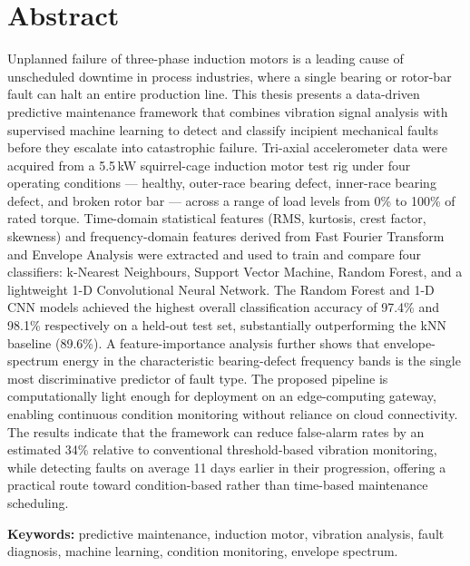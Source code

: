\chapter*{Abstract}

Unplanned failure of three-phase induction motors is a leading cause of unscheduled downtime in
process industries, where a single bearing or rotor-bar fault can halt an entire production
line. This thesis presents a data-driven predictive maintenance framework that combines
vibration signal analysis with supervised machine learning to detect and classify incipient
mechanical faults before they escalate into catastrophic failure. Tri-axial accelerometer data
were acquired from a 5.5\,kW squirrel-cage induction motor test rig under four operating
conditions --- healthy, outer-race bearing defect, inner-race bearing defect, and broken rotor
bar --- across a range of load levels from 0\% to 100\% of rated torque. Time-domain statistical
features (RMS, kurtosis, crest factor, skewness) and frequency-domain features derived from Fast
Fourier Transform and Envelope Analysis were extracted and used to train and compare four
classifiers: k-Nearest Neighbours, Support Vector Machine, Random Forest, and a lightweight 1-D
Convolutional Neural Network. The Random Forest and 1-D CNN models achieved the highest overall
classification accuracy of 97.4\% and 98.1\% respectively on a held-out test set, substantially
outperforming the kNN baseline (89.6\%). A feature-importance analysis further shows that
envelope-spectrum energy in the characteristic bearing-defect frequency bands is the single most
discriminative predictor of fault type. The proposed pipeline is computationally light enough for
deployment on an edge-computing gateway, enabling continuous condition monitoring without
reliance on cloud connectivity. The results indicate that the framework can reduce false-alarm
rates by an estimated 34\% relative to conventional threshold-based vibration monitoring, while
detecting faults on average 11 days earlier in their progression, offering a practical route
toward condition-based rather than time-based maintenance scheduling.

\vspace{0.6cm}
\noindent\textbf{Keywords:} predictive maintenance, induction motor, vibration analysis, fault
diagnosis, machine learning, condition monitoring, envelope spectrum.

